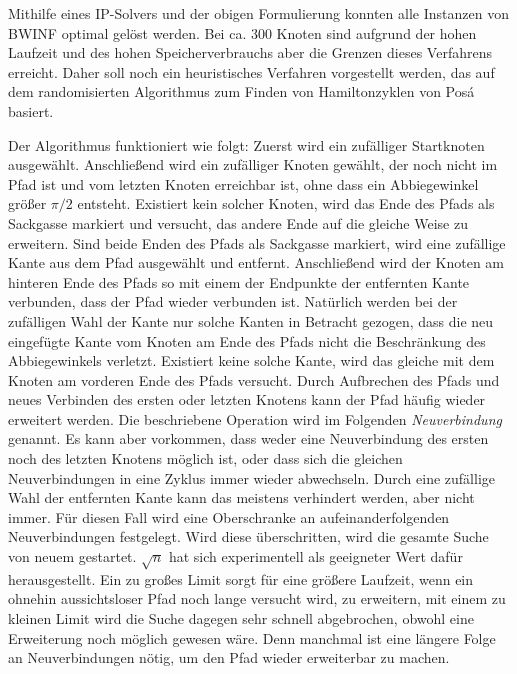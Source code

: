 \documentclass[a4paper, 10pt, ngerman]{article}
\begin{document}
Mithilfe eines IP-Solvers und der obigen Formulierung konnten alle Instanzen von BWINF optimal gelöst werden. Bei ca. 300 Knoten sind aufgrund der hohen Laufzeit und des hohen Speicherverbrauchs aber die Grenzen dieses Verfahrens erreicht. Daher soll noch ein heuristisches Verfahren vorgestellt werden, das auf dem randomisierten Algorithmus zum Finden von Hamiltonzyklen von Posá \cite{discrete-math} basiert.

Der Algorithmus funktioniert wie folgt: Zuerst wird ein zufälliger Startknoten ausgewählt. Anschließend wird ein zufälliger Knoten gewählt, der noch nicht im Pfad ist und vom letzten Knoten erreichbar ist, ohne dass ein Abbiegewinkel größer $\pi / 2$ entsteht. Existiert kein solcher Knoten, wird das Ende des Pfads als Sackgasse markiert und versucht, das andere Ende auf die gleiche Weise zu erweitern. Sind beide Enden des Pfads als Sackgasse markiert, wird eine zufällige Kante aus dem Pfad ausgewählt und entfernt. Anschließend wird der Knoten am hinteren Ende des Pfads so mit einem der Endpunkte der entfernten Kante verbunden, dass der Pfad wieder verbunden ist. Natürlich werden bei der zufälligen Wahl der Kante nur solche Kanten in Betracht gezogen, dass die neu eingefügte Kante vom Knoten am Ende des Pfads nicht die Beschränkung des Abbiegewinkels verletzt. Existiert keine solche Kante, wird das gleiche mit dem Knoten am vorderen Ende des Pfads versucht. Durch Aufbrechen des Pfads und neues Verbinden des ersten oder letzten Knotens kann der Pfad häufig wieder erweitert werden. Die beschriebene Operation wird im Folgenden \emph{Neuverbindung} genannt. Es kann aber vorkommen, dass weder eine Neuverbindung des ersten noch des letzten Knotens möglich ist, oder dass sich die gleichen Neuverbindungen in eine Zyklus immer wieder abwechseln. Durch eine zufällige Wahl der entfernten Kante kann das meistens verhindert werden, aber nicht immer. Für diesen Fall wird eine Oberschranke an aufeinanderfolgenden Neuverbindungen festgelegt. Wird diese überschritten, wird die gesamte Suche von neuem gestartet. $\sqrt n$ hat sich experimentell als geeigneter Wert dafür herausgestellt. Ein zu großes Limit sorgt für eine größere Laufzeit, wenn ein ohnehin aussichtsloser Pfad noch lange versucht wird, zu erweitern, mit einem zu kleinen Limit wird die Suche dagegen sehr schnell abgebrochen, obwohl eine Erweiterung noch möglich gewesen wäre. Denn manchmal ist eine längere Folge an Neuverbindungen nötig, um den Pfad wieder erweiterbar zu machen.
\end{document}
